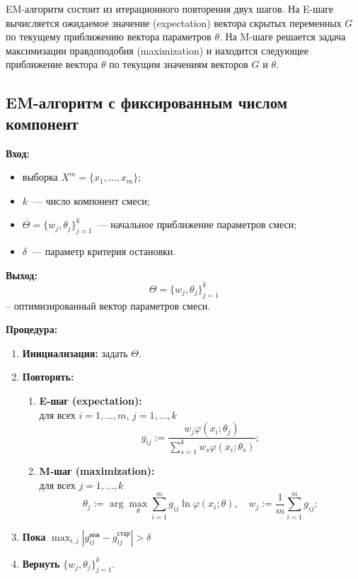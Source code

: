 EM-алгоритм состоит из итерационного повторения двух шагов. На E-шаге вычисляется ожидаемое значение (expectation) вектора скрытых переменных $G$ по текущему приближению вектора параметров $\theta$. На M-шаге решается задача максимизации правдоподобия (maximization) и находится следующее приближение вектора $\theta$ по текущим значениям векторов $G$ и $\theta$.

\subsection*{EM-алгоритм с фиксированным числом компонент}
\noindent
\textbf{Вход:}
\begin{itemize}
    \item выборка $X^m = \{x_1, \dots, x_m\}$;
    \item $k$~--- число компонент смеси;
    \item $\Theta = \{w_j, \theta_j\}_{j=1}^k$~--- начальное приближение параметров смеси;
    \item $\delta$~--- параметр критерия остановки.
\end{itemize}

\noindent
\textbf{Выход:} 
\[\Theta = \{w_j, \theta_j\}_{j=1}^k\] -- оптимизированный вектор параметров смеси.

\noindent
\textbf{Процедура:}
\begin{enumerate}
    \item \textbf{Инициализация:} задать $\Theta$.
    \item \textbf{Повторять:}
    \begin{enumerate}
        \item \textbf{E-шаг (expectation):}\\
        для всех $i = 1, \dots, m$, $j = 1, \dots, k$\\
        \[g_{ij} := \frac{w_j \varphi(x_i; \theta_j)}{\sum_{s=1}^k w_s \varphi(x_i; \theta_s)};
        \]
        \item \textbf{M-шаг (maximization):}\\
        для всех $j = 1, \dots, k$\\
        \[
        \theta_j := \arg \max_{\theta} \sum_{i=1}^m g_{ij} \ln \varphi(x_i; \theta), \quad w_j := \frac{1}{m} \sum_{i=1}^m g_{ij};
        \]
    \end{enumerate}
    \item \textbf{Пока} $\max_{i,j} |g^{\text{нов}}_{ij} - g^{\text{стар}}_{ij}| > \delta$
    \item \textbf{Вернуть} $\{w_j, \theta_j\}_{j=1}^k$.
\end{enumerate}

